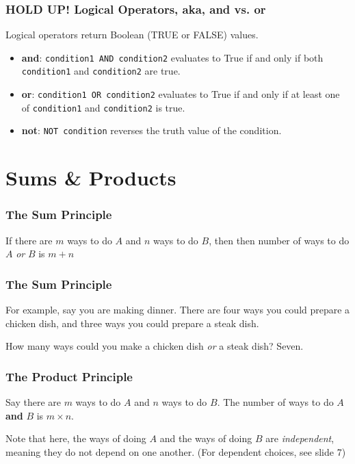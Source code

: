 \documentclass{beamer}
\newcommand{\<}{\langle}
\renewcommand{\>}{\rangle}
\begin{document}
\begin{frame}[fragile]
\frametitle{HOLD UP! Logical Operators, aka, and vs. or}

Logical operators return Boolean (TRUE or FALSE) values.

\begin{itemize}
\item \textbf{and}: \verb|condition1 AND condition2| evaluates to True if and only if both \verb|condition1| and \verb|condition2| are true.
\item \textbf{or}: \verb|condition1 OR condition2| evaluates to True if and only if at least one of \verb|condition1| and \verb|condition2| is true.
\item \textbf{not}: \verb|NOT condition| reverses the truth value of the condition.
\end{itemize}
\end{frame}



\section{Sums \& Products}
\begin{frame}
\frametitle{The Sum Principle}

If there are $m$ ways to do $A$ and $n$ ways to do $B$, then then number of ways to do $A$ \emph{or} $B$ is $m+n$
\end{frame}

\begin{frame}
\frametitle{The Sum Principle}

For example, say you are making dinner. There are four ways you could prepare a chicken dish, and three ways you could prepare a steak dish. \newline

How many ways could you make a chicken dish \emph{or} a steak dish? Seven.
\end{frame}

\begin{frame}
\frametitle{The Product Principle}

Say there are $m$ ways to do $A$ and $n$ ways to do $B$. The number of ways to do $A$ \textbf{and} $B$ is $m\times n$. \newline

Note that here, the ways of doing $A$ and the ways of doing $B$ are \emph{independent}, meaning they do not depend on one another. (For dependent choices, see slide 7)
\end{frame}
\end{document}
